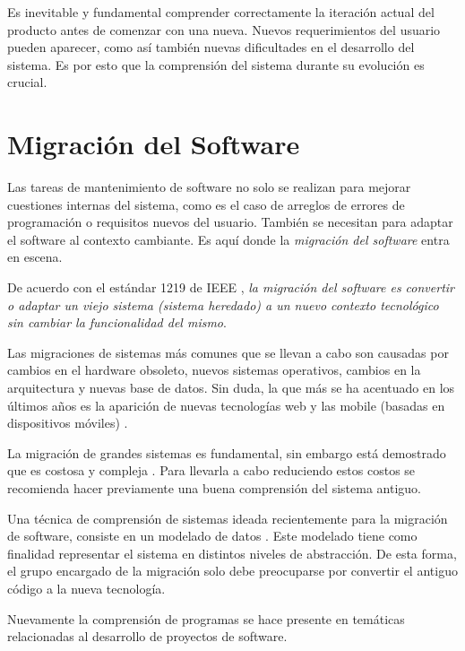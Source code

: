 Es inevitable y fundamental comprender correctamente la iteración actual del producto antes de comenzar con una nueva. Nuevos requerimientos del usuario pueden aparecer, como así también nuevas dificultades en el desarrollo del sistema. Es por esto que la comprensión del sistema durante su evolución es crucial.



\section{Migración del Software}

Las tareas de mantenimiento de software no solo se realizan para mejorar cuestiones internas del sistema, como es el caso de arreglos de errores de programación o requisitos nuevos del usuario. También se necesitan para adaptar el software al contexto cambiante. Es aquí donde la \textit{migración del software} entra en escena.
 
De acuerdo con el estándar 1219 de IEEE  \cite{STD1219}, \textit{la migración del software es convertir o adaptar un viejo sistema (sistema heredado) a un nuevo contexto tecnológico sin cambiar la funcionalidad del mismo}.

Las migraciones de sistemas más comunes que se llevan a cabo son causadas por cambios en el hardware obsoleto, nuevos sistemas operativos, cambios en la arquitectura y nuevas base de datos. Sin duda, la que más se ha acentuado en los últimos años es la aparición de nuevas tecnologías web y las mobile (basadas en dispositivos móviles) \cite{MMFAF08}.
 
La migración de grandes sistemas es fundamental, sin embargo está demostrado que es costosa y compleja \cite{MMFAF08}. Para llevarla a cabo reduciendo estos costos se recomienda hacer previamente una buena comprensión del sistema antiguo. 

Una técnica de comprensión de sistemas ideada recientemente para la migración de software, consiste en un mode\-lado de datos \cite{WHAFVR11}. Este modelado tiene como finalidad representar el sistema en distintos niveles de abstracción. De esta forma, el grupo encargado de la migración solo debe preocuparse por convertir el antiguo código a la nueva tecnología.

Nuevamente la comprensión de programas se hace presente en temáticas relacionadas al desarrollo de proyectos de software.

